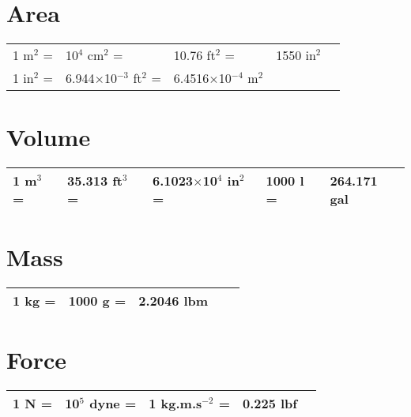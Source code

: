 \section{Area}\label{Chapter:UnitConversion:Section:Area}
     \begin{center}
     \begin{tabular}{|l l l l l|}
       \hline
       1 m$^{2}$ =& 10$^{4}$ cm$^{2}$ =& 10.76 ft$^{2}$ =& 1550 in$^{2}$ & \\
       1 in$^{2}$ =& 6.944$\times$10$^{-3}$ ft$^{2}$ =& 6.4516$\times$10$^{-4}$ m$^{2}$ & & \\
       \hline           
     \end{tabular}
     \end{center}
          
\section{Volume}\label{Chapter:UnitConversion:Section:Volume}
     \begin{center}
     \begin{tabular}{|l l l l l|}
       \hline    
       1 m$^{3}$ =& 35.313 ft$^{3}$ =& 6.1023$\times$10$^{4}$ in$^{2}$ =& 1000 l =& 264.171 gal \\
       \hline            
     \end{tabular}
     \end{center}
          
\section{Mass}\label{Chapter:UnitConversion:Section:Mass}
     \begin{center}
     \begin{tabular}{|l l l l l|}
       \hline    
        1 kg =& 1000 g =& 2.2046 lbm & & \\
       \hline            
     \end{tabular}
     \end{center}


          
\section{Force}\label{Chapter:UnitConversion:Section:Force}
     \begin{center}
     \begin{tabular}{|l l l l l|}
       \hline    
         1 N =& 10$^{5}$ dyne =& 1 kg.m.s$^{-2}$ =& 0.225 lbf & \\
       \hline            
     \end{tabular}
     \end{center}

